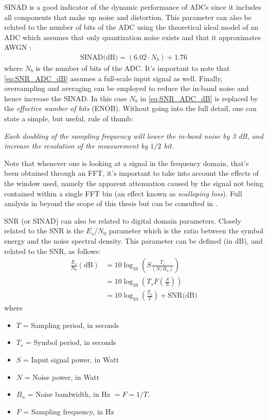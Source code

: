 SINAD is a good indicator of the dynamic performance of ADCs since it includes all components that make up noise and distortion. This parameter can also be related to the number of bits of the ADC using the theoretical ideal model of an ADC which assumes that only quantization noise exists and that it approximates AWGN \cite{improve_adc_res}:
\begin{align} \label{eq:SNR_ADC_dB}
  \text{SINAD(dB)} = (6.02 \cdot N_b) + 1.76
\end{align}
where $N_b$ is the number of bits of the ADC. It's important to note that \eqref{eq:SNR_ADC_dB} assumes a full-scale input signal as well. Finally, oversampling and averaging can be employed to reduce the in-band noise and hence increase the SINAD. In this case $N_b$ in \eqref{eq:SNR_ADC_dB} is replaced by the \emph{effective number of bits} (ENOB). Without going into the full detail, one can state a simple, but useful, rule of thumb:

\begin{displayquote}
  \emph{Each doubling of the sampling frequency will lower the in-band noise by 3 dB, and increase the resolution of the measurement by $1/2$ bit.}
\end{displayquote}

Note that whenever one is looking at a signal in the frequency domain, that's been obtained through an FFT, it's important to take into account the effects of the window used, namely the apparent attenuation caused by the signal not being contained within a single FFT bin (an effect known as \emph{scalloping loss}). Full analysis in beyond the scope of this thesis but can be consulted in \cite{harris_windows}.

SNR (or SINAD) can also be related to digital domain parameters. Closely related to the SNR is the $E_s$/$N_0$ parameter which is the ratio between the symbol energy and the noise spectral density. This parameter can be defined (in dB), and related to the SNR, as follows:
\begin{align}
  \frac{E_s}{N_0} (\text{dB}) & = 10\log_{10}\left(S\frac{T_{s}}{(N/B_n)}\right) \nonumber \\
                              & = 10\log_{10}\left(T_{s}F\left(\frac{S}{N}\right)\right) \nonumber \\
                              & = 10\log_{10}\left(\frac{T_{s}}{T}\right) + \text{SNR(dB)}
\end{align}
where
\begin{itemize}
  \item $T$ = Sampling period, in seconds
  \item $T_s$ = Symbol period, in seconds
  \item $S$ = Input signal power, in Watt
  \item $N$ = Noise power, in Watt
  \item $B_n$ = Noise bandwidth, in Hz $= F = 1/T$.
  \item $F$ = Sampling frequency, in Hz
\end{itemize}

